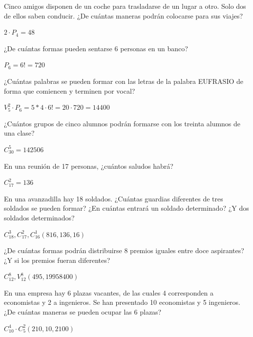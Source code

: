 \documentclass[spanish, 11pt]{exam}
\begin{document}
\begin{questions}
\question Cinco amigos disponen de un coche para trasladarse de un lugar
a otro. Solo dos de ellos saben conducir. ¿De cuántas maneras podrán colocarse para sus viajes?
\begin{solution}
$2\cdot P_4=48$
\end{solution}


\question ¿De cuántas formas pueden sentarse 6 personas en un banco?
\begin{solution}
$P_6= 6!=720$
\end{solution}

\question ¿Cuántas palabras se pueden formar con las letras de la palabra EUFRASIO de forma que comiencen y terminen por vocal?
\begin{solution}
$V_5^2\cdot P_6= 5*4 \cdot 6!=20\cdot720=14400 $
\end{solution}


\question ¿Cuántos grupos de cinco alumnos podrán formarse con los
treinta alumnos de una clase?
\begin{solution}
$C_30^5=142506 $
\end{solution}

\question En una reunión de 17 personas, ¿cuántos saludos habrá?
\begin{solution}
$C_17^2=136 $
\end{solution}

\question En una avanzadilla hay 18 soldados. ¿Cuántas guardias diferentes de tres soldados se pueden formar? ¿En cuántas entrará un
soldado determinado? ¿Y dos soldados determinados?
\begin{solution}
$C_18^3, C_17^2, C_16^1 (816, 136, 16)$
\end{solution}

\question ¿De cuántas formas podrán distribuirse 8 premios iguales entre doce aspirantes? ¿Y si los premios fueran diferentes?
\begin{solution}
$C_12^8, V_12^8 (495, 19958400)$
\end{solution}

\question En una empresa hay 6 plazas vacantes, de las cuales 4 corresponden a economistas y 2 a ingenieros. Se han presentado 10 economistas y 5 ingenieros. ¿De cuántas maneras se pueden ocupar las 6 plazas?
\begin{solution}
$C_10^4 \cdot C_5^2 (210, 10, 2100)$
\end{solution}

\end{questions}
\end{document}
